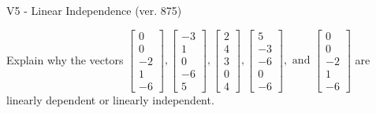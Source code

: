 \begin{exercise}
  \begin{exerciseTitle}V5 - Linear Independence (ver. 875)\end{exerciseTitle}
  \begin{exerciseStatement}
    Explain why the vectors \(\left[\begin{array}{r}
0 \\
0 \\
-2 \\
1 \\
-6
\end{array}\right] , \left[\begin{array}{r}
-3 \\
1 \\
0 \\
-6 \\
5
\end{array}\right] , \left[\begin{array}{r}
2 \\
4 \\
3 \\
0 \\
4
\end{array}\right] , \left[\begin{array}{r}
5 \\
-3 \\
-6 \\
0 \\
-6
\end{array}\right] , \text{ and } \left[\begin{array}{r}
0 \\
0 \\
-2 \\
1 \\
-6
\end{array}\right]\) are linearly dependent or linearly independent.	



\end{exerciseStatement}
\end{exercise}
